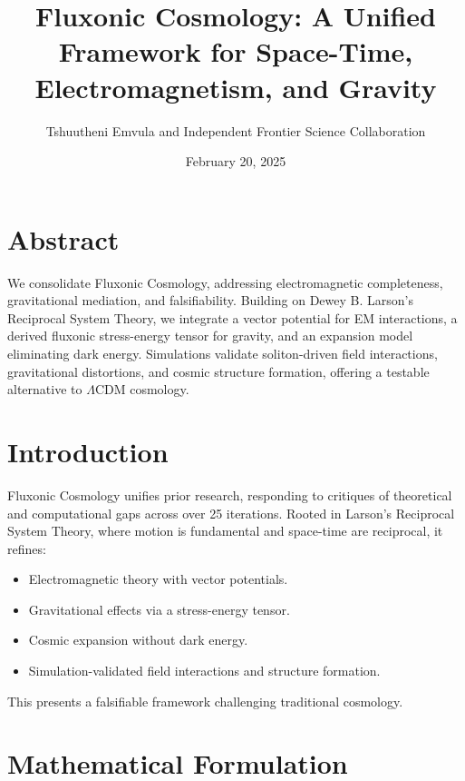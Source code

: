 \documentclass{article}
\title{Fluxonic Cosmology: A Unified Framework for Space-Time, Electromagnetism, and Gravity}
\author{Tshuutheni Emvula and Independent Frontier Science Collaboration}
\date{February 20, 2025}
\begin{document}
\maketitle

\section*{Abstract}
We consolidate Fluxonic Cosmology, addressing electromagnetic completeness, gravitational mediation, and falsifiability. Building on Dewey B. Larson’s Reciprocal System Theory, we integrate a vector potential for EM interactions, a derived fluxonic stress-energy tensor for gravity, and an expansion model eliminating dark energy. Simulations validate soliton-driven field interactions, gravitational distortions, and cosmic structure formation, offering a testable alternative to \(\Lambda\)CDM cosmology.

\section{Introduction}
Fluxonic Cosmology unifies prior research, responding to critiques of theoretical and computational gaps across over 25 iterations. Rooted in Larson’s Reciprocal System Theory, where motion is fundamental and space-time are reciprocal, it refines:
\begin{itemize}
    \item Electromagnetic theory with vector potentials.
    \item Gravitational effects via a stress-energy tensor.
    \item Cosmic expansion without dark energy.
    \item Simulation-validated field interactions and structure formation.
\end{itemize}
This presents a falsifiable framework challenging traditional cosmology.

\section{Mathematical Formulation}
\end{document}
